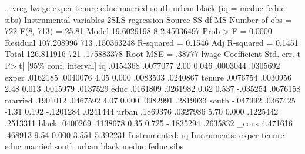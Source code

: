. ivreg lwage exper tenure educ married south urban black (iq = meduc feduc sibs)
{\smallskip}
Instrumental variables 2SLS regression
{\smallskip}
      Source {\VBAR}       SS           df       MS      Number of obs   =       722
   F(8, 713)       =     25.81
       Model {\VBAR}  19.6029198         8  2.45036497   Prob > F        =    0.0000
    Residual {\VBAR}  107.208996       713  .150363248   R-squared       =    0.1546
   Adj R-squared   =    0.1451
       Total {\VBAR}  126.811916       721  .175883378   Root MSE        =    .38777
{\smallskip}
       lwage {\VBAR} Coefficient  Std. err.      t    P>|t|     [95\% conf. interval]
          iq {\VBAR}   .0154368   .0077077     2.00   0.046     .0003044    .0305692
       exper {\VBAR}   .0162185   .0040076     4.05   0.000     .0083503    .0240867
      tenure {\VBAR}   .0076754   .0030956     2.48   0.013     .0015979    .0137529
        educ {\VBAR}   .0161809   .0261982     0.62   0.537     -.035254    .0676158
     married {\VBAR}   .1901012   .0467592     4.07   0.000     .0982991    .2819033
       south {\VBAR}   -.047992   .0367425    -1.31   0.192    -.1201284    .0241444
       urban {\VBAR}   .1869376   .0327986     5.70   0.000     .1225442    .2513311
       black {\VBAR}   .0400269   .1138678     0.35   0.725    -.1835294    .2635832
       _cons {\VBAR}   4.471616    .468913     9.54   0.000        3.551    5.392231
Instrumented: iq
 Instruments: exper tenure educ married south urban black meduc feduc sibs
{\smallskip}
